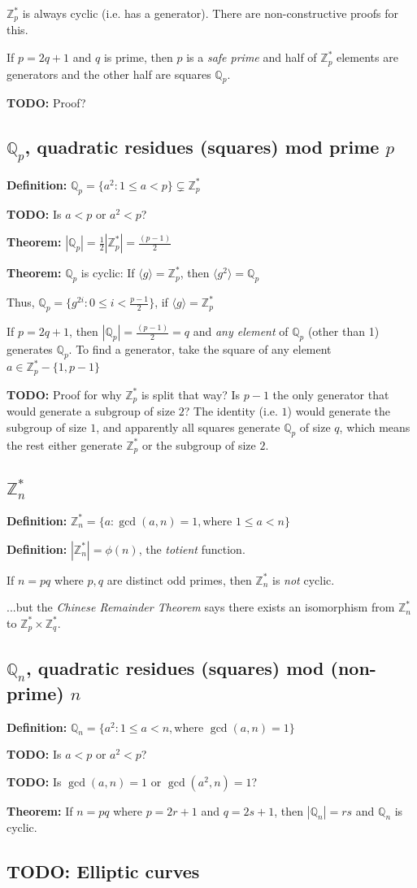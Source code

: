 \documentclass[11pt]{article}
\newcommand{\Zp}{\mathbb{Z}^{\ast}_p}
\newcommand{\Zq}{\mathbb{Z}^{\ast}_q}
\newcommand{\Zn}{\mathbb{Z}^{\ast}_n}
\newcommand{\Qp}{\mathbb{Q}_p}
\newcommand{\Qn}{\mathbb{Q}_n}
\newcommand{\gen}[1]{\langle #1 \rangle}
\newcommand{\definition}{\textbf{Definition:} }
\newcommand{\theorem}{\textbf{Theorem:} }
\newcommand{\sz}[1]{\left|#1\right|}
\begin{document}
$\Zp$ is always cyclic (i.e. has a generator). There are non-constructive proofs
for this.

If $p = 2q + 1$ and $q$ is prime, then $p$ is a \emph{safe prime} and half of
$\Zp$ elements are generators and the other half are squares $\Qp$.

\textbf{TODO:} Proof?

\subsection{$\Qp$, quadratic residues (squares) mod prime $p$}
\definition $\Qp = \{a^2 : 1 \le a < p\} \subsetneq \Zp$

\textbf{TODO:} Is $a < p$ or $a^2 < p$?

\theorem $|\Qp| = \frac{1}{2}\sz{\Zp} = \frac{(p-1)}{2}$

\theorem $\Qp$ is cyclic: If $\gen{g} = \Zp$, then $\gen{g^2} = \Qp$

Thus, $\Qp = \{g^{2i} : 0 \le i < \frac{p-1}{2}\}$, if $\gen{g} = \Zp$

If $p = 2q + 1$, then $\sz{\Qp} = \frac{(p-1)}{2} = q$ and \emph{any element} of
$\Qp$ (other than 1) generates $\Qp$. To find a generator, take the square of
any element $a \in \Zp - \{1, p-1\}$

\textbf{TODO:} Proof for why $\Zp$ is split that way? Is $p-1$ the only generator
that would generate a subgroup of size $2$? The identity (i.e. $1$) would generate
the subgroup of size $1$, and apparently all squares generate $\Qp$ of size $q$,
which means the rest either generate $\Zp$ or the subgroup of size $2$.

\subsection{$\Zn$}

\definition $\Zn = \{a : \gcd(a, n) = 1, \text{where } 1 \le a < n\}$

\definition $\sz{\Zn} = \phi(n)$, the \emph{totient} function.

If $n = pq$ where $p,q$ are distinct odd primes, then $\Zn$ is \emph{not} cyclic.

...but the \emph{Chinese Remainder Theorem} says there exists an isomorphism
from $\Zn$ to $\Zp \times \Zq$.

\subsection{$\Qn$, quadratic residues (squares) mod (non-prime) $n$}

\definition $\Qn = \{a^2 : 1 \le a < n, \text{where } \gcd(a, n) = 1\}$

\textbf{TODO:} Is $a < p$ or $a^2 < p$?

\textbf{TODO:} Is $\gcd(a, n) = 1$ or $\gcd(a^2, n) = 1$?

\theorem If $n = pq$ where $p = 2r+1$ and $q = 2s+1$, then $\sz{\Qn} = rs$ and
$\Qn$ is cyclic.

\subsection{TODO: Elliptic curves}
\end{document}
